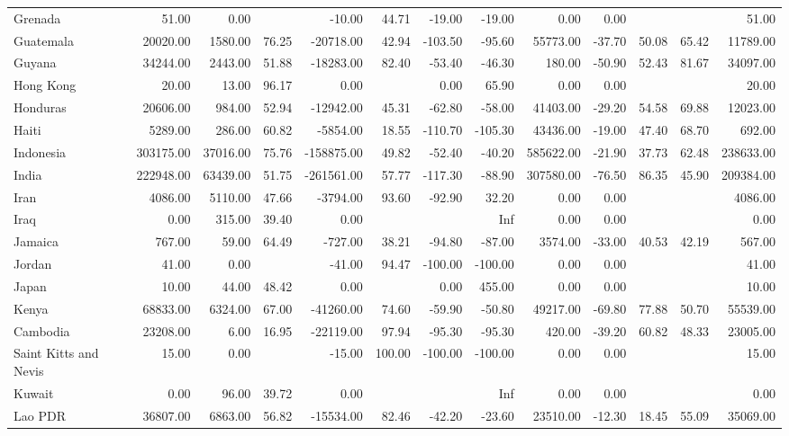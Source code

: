 \begin{table}[ht]
\begin{tabular}{lrrrrrrrrrrrr}
  Grenada & 51.00 & 0.00 &  & -10.00 & 44.71 & -19.00 & -19.00 & 0.00 & 0.00 &  &  & 51.00 \\ 
  Guatemala & 20020.00 & 1580.00 & 76.25 & -20718.00 & 42.94 & -103.50 & -95.60 & 55773.00 & -37.70 & 50.08 & 65.42 & 11789.00 \\ 
  Guyana & 34244.00 & 2443.00 & 51.88 & -18283.00 & 82.40 & -53.40 & -46.30 & 180.00 & -50.90 & 52.43 & 81.67 & 34097.00 \\ 
  Hong Kong & 20.00 & 13.00 & 96.17 & 0.00 &  & 0.00 & 65.90 & 0.00 & 0.00 &  &  & 20.00 \\ 
  Honduras & 20606.00 & 984.00 & 52.94 & -12942.00 & 45.31 & -62.80 & -58.00 & 41403.00 & -29.20 & 54.58 & 69.88 & 12023.00 \\ 
  Haiti & 5289.00 & 286.00 & 60.82 & -5854.00 & 18.55 & -110.70 & -105.30 & 43436.00 & -19.00 & 47.40 & 68.70 & 692.00 \\ 
  Indonesia & 303175.00 & 37016.00 & 75.76 & -158875.00 & 49.82 & -52.40 & -40.20 & 585622.00 & -21.90 & 37.73 & 62.48 & 238633.00 \\ 
  India & 222948.00 & 63439.00 & 51.75 & -261561.00 & 57.77 & -117.30 & -88.90 & 307580.00 & -76.50 & 86.35 & 45.90 & 209384.00 \\ 
  Iran & 4086.00 & 5110.00 & 47.66 & -3794.00 & 93.60 & -92.90 & 32.20 & 0.00 & 0.00 &  &  & 4086.00 \\ 
  Iraq & 0.00 & 315.00 & 39.40 & 0.00 &  &  & Inf & 0.00 & 0.00 &  &  & 0.00 \\ 
  Jamaica & 767.00 & 59.00 & 64.49 & -727.00 & 38.21 & -94.80 & -87.00 & 3574.00 & -33.00 & 40.53 & 42.19 & 567.00 \\ 
  Jordan & 41.00 & 0.00 &  & -41.00 & 94.47 & -100.00 & -100.00 & 0.00 & 0.00 &  &  & 41.00 \\ 
  Japan & 10.00 & 44.00 & 48.42 & 0.00 &  & 0.00 & 455.00 & 0.00 & 0.00 &  &  & 10.00 \\ 
  Kenya & 68833.00 & 6324.00 & 67.00 & -41260.00 & 74.60 & -59.90 & -50.80 & 49217.00 & -69.80 & 77.88 & 50.70 & 55539.00 \\ 
  Cambodia & 23208.00 & 6.00 & 16.95 & -22119.00 & 97.94 & -95.30 & -95.30 & 420.00 & -39.20 & 60.82 & 48.33 & 23005.00 \\ 
  Saint Kitts and Nevis & 15.00 & 0.00 &  & -15.00 & 100.00 & -100.00 & -100.00 & 0.00 & 0.00 &  &  & 15.00 \\ 
  Kuwait & 0.00 & 96.00 & 39.72 & 0.00 &  &  & Inf & 0.00 & 0.00 &  &  & 0.00 \\ 
  Lao PDR & 36807.00 & 6863.00 & 56.82 & -15534.00 & 82.46 & -42.20 & -23.60 & 23510.00 & -12.30 & 18.45 & 55.09 & 35069.00 \\ 

\end{tabular}
\end{table}
